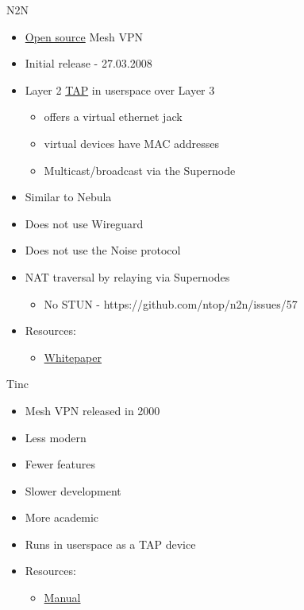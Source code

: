 \hypertarget{notes__02056-n2n.md}{}
\begin{block}{N2N}
\protect\hypertarget{notes__02056-n2n.md__n2n}{}
\begin{itemize}
\tightlist
\item
  \href{https://github.com/ntop/n2n}{Open source} Mesh VPN
\item
  Initial release - 27.03.2008
\item
  Layer 2 \href{notes/02021-internet-protocol}{TAP} in userspace over
  Layer 3

  \begin{itemize}
  \tightlist
  \item
    offers a virtual ethernet jack
  \item
    virtual devices have MAC addresses
  \item
    Multicast/broadcast via the Supernode
  \end{itemize}
\item
  Similar to Nebula
\item
  Does not use Wireguard
\item
  Does not use the Noise protocol
\item
  NAT traversal by relaying via Supernodes

  \begin{itemize}
  \tightlist
  \item
    No STUN - https://github.com/ntop/n2n/issues/57
  \end{itemize}
\item
  Resources:

  \begin{itemize}
  \tightlist
  \item
    \href{http://luca.ntop.org/n2n.pdf}{Whitepaper}
  \end{itemize}
\end{itemize}
\end{block}

\hypertarget{notes__02058-tinc.md}{}
\begin{block}{Tinc}
\protect\hypertarget{notes__02058-tinc.md__tinc}{}
\begin{itemize}
\tightlist
\item
  Mesh VPN released in 2000
\item
  Less modern
\item
  Fewer features
\item
  Slower development
\item
  More academic
\item
  Runs in userspace as a TAP device
\item
  Resources:

  \begin{itemize}
  \tightlist
  \item
    \href{https://www.tinc-vpn.org/documentation-1.1/tinc.pdf}{Manual}
  \end{itemize}
\end{itemize}
\end{block}

